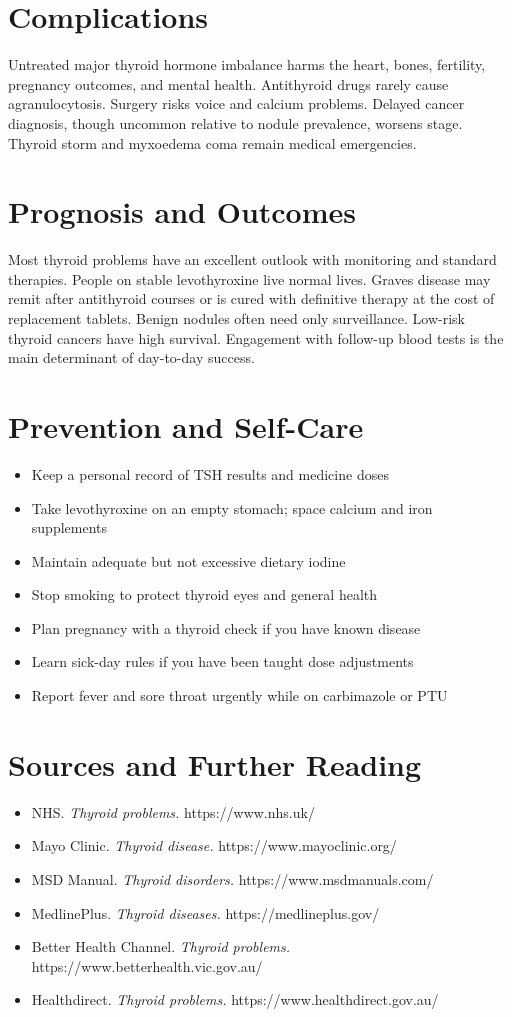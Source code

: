 \section*{Complications}
Untreated major thyroid hormone imbalance harms the heart, bones, fertility, pregnancy outcomes, and mental health. Antithyroid drugs rarely cause agranulocytosis. Surgery risks voice and calcium problems. Delayed cancer diagnosis, though uncommon relative to nodule prevalence, worsens stage. Thyroid storm and myxoedema coma remain medical emergencies.

\section*{Prognosis and Outcomes}
Most thyroid problems have an excellent outlook with monitoring and standard therapies. People on stable levothyroxine live normal lives. Graves disease may remit after antithyroid courses or is cured with definitive therapy at the cost of replacement tablets. Benign nodules often need only surveillance. Low-risk thyroid cancers have high survival. Engagement with follow-up blood tests is the main determinant of day-to-day success.

\section*{Prevention and Self-Care}
\begin{itemize}
    \item Keep a personal record of TSH results and medicine doses
    \item Take levothyroxine on an empty stomach; space calcium and iron supplements
    \item Maintain adequate but not excessive dietary iodine
    \item Stop smoking to protect thyroid eyes and general health
    \item Plan pregnancy with a thyroid check if you have known disease
    \item Learn sick-day rules if you have been taught dose adjustments
    \item Report fever and sore throat urgently while on carbimazole or PTU
\end{itemize}

\section*{Sources and Further Reading}
\begin{itemize}
    \item NHS. \textit{Thyroid problems.} https://www.nhs.uk/
    \item Mayo Clinic. \textit{Thyroid disease.} https://www.mayoclinic.org/
    \item MSD Manual. \textit{Thyroid disorders.} https://www.msdmanuals.com/
    \item MedlinePlus. \textit{Thyroid diseases.} https://medlineplus.gov/
    \item Better Health Channel. \textit{Thyroid problems.} https://www.betterhealth.vic.gov.au/
    \item Healthdirect. \textit{Thyroid problems.} https://www.healthdirect.gov.au/
\end{itemize}
